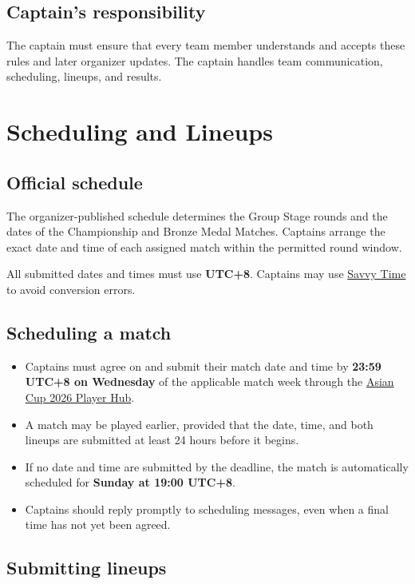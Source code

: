 \documentclass[10pt,a4paper]{article}
\newcommand{\term}[1]{\textbf{#1}}
\newcommand{\PlayerHub}{\href{https://carcassonne.gg/player-hub/tournaments/?id=Asian-Cup-2026}{Asian Cup 2026 Player Hub}}
\begin{document}
\subsection{Captain's responsibility}

The captain must ensure that every team member understands and accepts these
rules and later organizer updates. The captain handles team communication,
scheduling, lineups, and results.

\section{Scheduling and Lineups}

\subsection{Official schedule}

The organizer-published schedule determines the Group Stage rounds and the
dates of the Championship and Bronze Medal Matches. Captains arrange the exact
date and time of each assigned match within the permitted round window.

All submitted dates and times must use \term{UTC+8}. Captains may use
\href{https://savvytime.com/converter}{Savvy Time} to avoid conversion errors.

\subsection{Scheduling a match}

\begin{itemize}
  \item Captains must agree on and submit their match date and time by
        \term{23:59 UTC+8 on Wednesday} of the applicable match week through
        the \PlayerHub.
  \item A match may be played earlier, provided that the date, time, and both
        lineups are submitted at least 24 hours before it begins.
  \item If no date and time are submitted by the deadline, the match is
        automatically scheduled for \term{Sunday at 19:00 UTC+8}.
  \item Captains should reply promptly to scheduling messages, even when a final
        time has not yet been agreed.
\end{itemize}

\subsection{Submitting lineups}
\end{document}
